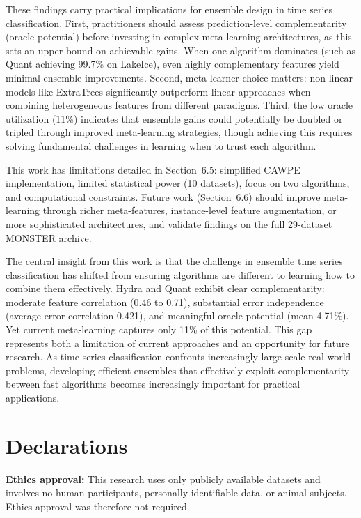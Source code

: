 \documentclass[pdflatex,sn-basic]{sn-jnl}           %
\theoremstyle{thmstyleone}%
\theoremstyle{thmstyletwo}%
\theoremstyle{thmstylethree}%
\begin{document}
These findings carry practical implications for ensemble design in time series classification. First, practitioners should assess prediction-level complementarity (oracle potential) before investing in complex meta-learning architectures, as this sets an upper bound on achievable gains. When one algorithm dominates (such as Quant achieving 99.7\% on LakeIce), even highly complementary features yield minimal ensemble improvements. Second, meta-learner choice matters: non-linear models like ExtraTrees significantly outperform linear approaches when combining heterogeneous features from different paradigms. Third, the low oracle utilization (11\%) indicates that ensemble gains could potentially be doubled or tripled through improved meta-learning strategies, though achieving this requires solving fundamental challenges in learning when to trust each algorithm.

This work has limitations detailed in Section~6.5: simplified CAWPE implementation, limited statistical power (10 datasets), focus on two algorithms, and computational constraints. Future work (Section~6.6) should improve meta-learning through richer meta-features, instance-level feature augmentation, or more sophisticated architectures, and validate findings on the full 29-dataset MONSTER archive.

The central insight from this work is that the challenge in ensemble time series classification has shifted from ensuring algorithms are different to learning how to combine them effectively. Hydra and Quant exhibit clear complementarity: moderate feature correlation (0.46 to 0.71), substantial error independence (average error correlation 0.421), and meaningful oracle potential (mean 4.71\%). Yet current meta-learning captures only 11\% of this potential. This gap represents both a limitation of current approaches and an opportunity for future research. As time series classification confronts increasingly large-scale real-world problems, developing efficient ensembles that effectively exploit complementarity between fast algorithms becomes increasingly important for practical applications.

\backmatter

\section*{Declarations}

\noindent
\textbf{Ethics approval:} This research uses only publicly available datasets and involves no human participants, personally identifiable data, or animal subjects. Ethics approval was therefore not required.
\end{document}

